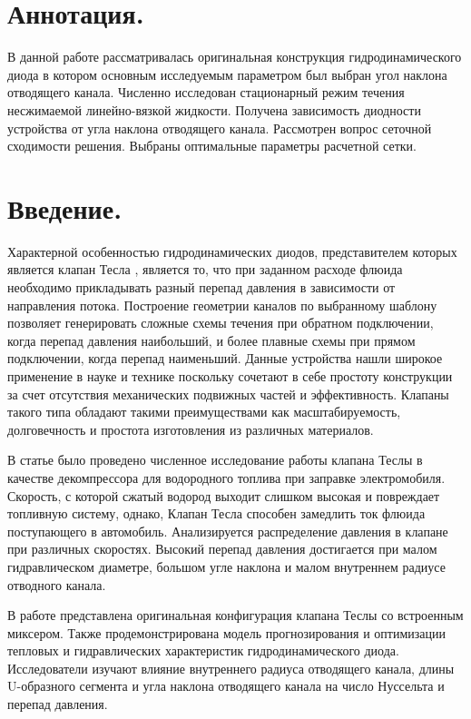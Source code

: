 \documentclass[10pt,a4paper]{book}
\begin{document}
    
    
    \section*{Аннотация.}

        В данной работе рассматривалась оригинальная конструкция гидродинамического диода в котором основным исследуемым параметром был выбран угол наклона отводящего канала. Численно исследован стационарный режим течения несжимаемой линейно-вязкой жидкости. Получена зависимость диодности устройства от угла наклона отводящего канала. Рассмотрен вопрос сеточной сходимости решения. Выбраны оптимальные параметры расчетной сетки.

    \section*{Введение.}

        Характерной особенностью гидродинамических диодов, представителем которых является клапан Тесла \cite{TeslaValveReview}, является то, что при заданном расходе флюида необходимо прикладывать разный перепад давления в зависимости от направления потока. Построение геометрии каналов по выбранному шаблону позволяет генерировать сложные схемы течения при обратном подключении, когда перепад давления наибольший, и более плавные схемы при прямом подключении, когда перепад наименьший. Данные устройства нашли широкое применение в науке и технике поскольку сочетают в себе простоту конструкции за счет отсутствия механических подвижных частей и эффективность. Клапаны такого типа обладают такими преимуществами как масштабируемость, долговечность и простота изготовления из различных материалов.

        В статье \cite{JIN20188888} было проведено численное исследование работы клапана Теслы в качестве декомпрессора для водородного топлива при заправке электромобиля. Скорость, с которой сжатый водород выходит слишком высокая и повреждает топливную систему, однако, Клапан Тесла способен замедлить ток флюида поступающего в автомобиль. Анализируется распределение давления в клапане при различных скоростях. Высокий перепад давления достигается при малом гидравлическом диаметре, большом угле наклона и малом внутреннем радиусе отводного канала. 
        
        В работе \cite{DU2023103670} представлена оригинальная конфигурация клапана Теслы со встроенным миксером. Также продемонстрирована модель прогнозирования и оптимизации тепловых и гидравлических характеристик гидродинамического диода. Исследователи изучают влияние внутреннего радиуса отводящего канала, длины U-образного сегмента и угла наклона отводящего канала на число Нуссельта и перепад давления.
        
\end{document}
